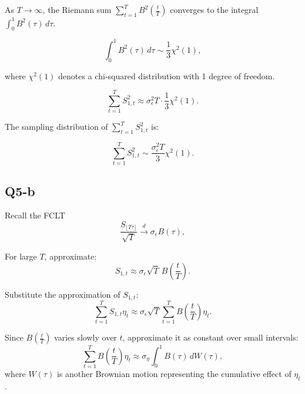 \documentclass{article} %
\begin{document}
 As \( T \to \infty \), the Riemann sum \( \sum_{t=1}^{T} B^2\left(\frac{t}{T}\right) \) converges to the integral \( \int_{0}^{1} B^2(\tau) \, d\tau \).

\begin{equation}
   \int_{0}^{1} B^2(\tau) \, d\tau \sim \frac{1}{3} \chi^2(1),
\end{equation}

where \( \chi^2(1) \) denotes a chi-squared distribution with 1 degree of freedom.

\begin{equation}
   \sum_{t=1}^{T} S_{1,t}^2 \approx \sigma_{\epsilon}^2 T \cdot \frac{1}{3} \chi^2(1).
\end{equation}

The sampling distribution of \( \sum_{t=1}^{T} S_{1,t}^2 \) is:

\begin{equation}
\sum_{t=1}^{T} S_{1,t}^2 \sim \frac{\sigma_{\epsilon}^2 T}{3} \chi^2(1).
\end{equation}


\subsection{Q5-b}

Recall the FCLT 
\begin{equation}
 \frac{S_{\lfloor T \tau \rfloor}}{\sqrt{T}} \overset{d}{\longrightarrow} \sigma_{\epsilon} B(\tau),
\end{equation}

For large \( T \), approximate:
\begin{equation}
   S_{1,t} \approx \sigma_{\epsilon} \sqrt{T}\, B\left(\frac{t}{T}\right).
\end{equation}

Substitute the approximation of \( S_{1,t} \):
\begin{equation}
 \sum_{t=1}^{T} S_{1,t} \eta_t \approx \sigma_{\epsilon} \sqrt{T} \sum_{t=1}^{T} B\left(\frac{t}{T}\right) \eta_t.
\end{equation}

Since \( B\left(\frac{t}{T}\right) \) varies slowly over \( t \), approximate it as constant over small intervals:
\begin{equation}
 \sum_{t=1}^{T} B\left(\frac{t}{T}\right) \eta_t \approx \sigma_{\eta} \int_{0}^{1} B(\tau) \, dW(\tau),
\end{equation}
where \( W(\tau) \) is another Brownian motion representing the cumulative effect of \( \eta_t \).
\end{document}
